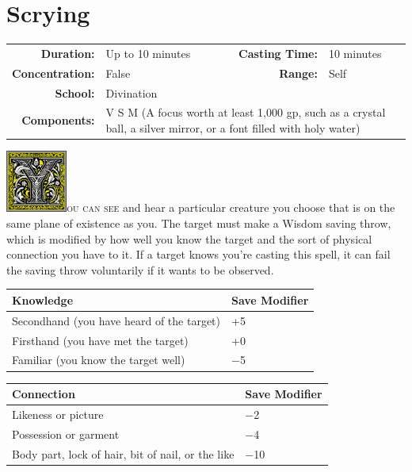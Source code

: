 \documentclass[12pt,showtrims]{memoir}
\begin{document}
\newpage
\section*{Scrying}
{
\small\centering\vspace{-6pt}
\begin{tabular}{rlrl}
\toprule

\textbf{Duration:} & Up to 10 minutes &
\textbf{Casting Time:} & 10 minutes \\
\textbf{Concentration:} & False &
\textbf{Range:} & Self \\
\textbf{School:} & Divination \\
\textbf{Components:} & \multicolumn{3}{p{0.7\textwidth}}{V S M (A focus worth at least 1,000 gp, such as a crystal ball, a silver mirror, or a font filled with holy water)}\\

\bottomrule
\end{tabular}
}

\vspace{1\baselineskip}\noindent
\lettrine[lines=4]{\includegraphics[height=58pt]{initials/Y.png}}{ou can see} and hear a particular creature you choose that is on the same plane of existence as you. The target must make a Wisdom saving throw, which is modified by how well you know the target and the sort of physical connection you have to it. If a target knows you’re casting this spell, it can fail the saving throw voluntarily if it wants to be observed.

\begin{center}
\begin{tabular}{ll}
\toprule
Knowledge & Save Modifier \\
\midrule
Secondhand (you have heard of the target) & +5 \\
Firsthand (you have met the target) & +0 \\
Familiar (you know the target well) & −5 \\
\bottomrule
\end{tabular}
\end{center}

\begin{center}
\begin{tabular}{ll}
\toprule
Connection & Save Modifier \\
\midrule
Likeness or picture & −2 \\
Possession or garment & −4 \\
Body part, {\small lock of hair, bit of nail, or the like} & −10 \\
\bottomrule
\end{tabular}
\end{center}
\end{document}
